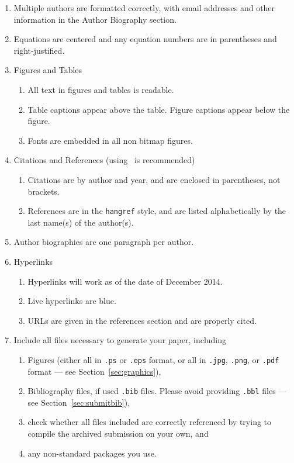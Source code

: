 \documentclass{wscpaperproc}
\theoremstyle{wsc}
\begin{document}
\begin{enumerate}
	\item Multiple authors are formatted correctly, with email addresses and other information in the Author Biography section.
	\item Equations are centered and any equation numbers are in parentheses and right-justified.
	\item Figures and Tables
	\begin{enumerate}
		\item All text in figures and tables is readable.
		\item Table captions appear above the table. Figure captions appear below the figure.
		\item Fonts are embedded in all non bitmap figures.
	\end{enumerate}
	\item Citations and References (using \BibTeX\ is recommended)
	\begin{enumerate}
		\item Citations are by author and year, and are enclosed in parentheses, not brackets.
		\item References are in the {\tt hangref} style, and are listed alphabetically by the last name(s) of the author(s).
	\end{enumerate}
	\item Author biographies are one paragraph per author.
	\item Hyperlinks
	\begin{enumerate}
		\item Hyperlinks will work as of the date of December 2014.
		\item Live hyperlinks are blue.
		\item URLs are given in the references section and are properly cited.
	\end{enumerate}
	\item Include all files necessary to generate your paper, including
	\begin{enumerate}
		\item Figures (either all in {\tt .ps} or {\tt .eps} format, or all in {\tt .jpg}, {\tt .png}, or {\tt .pdf} format --- see Section~\ref{sec:graphics}),
		\item Bibliography files, if used {\tt .bib} files. Please avoid providing {\tt .bbl} files --- see Section~\ref{sec:submitbib}),
		\item check whether all files included are correctly referenced by trying to compile the archived submission on your own, and
		\item any non-standard packages you use.
	\end{enumerate}
\end{enumerate}
\end{document}
